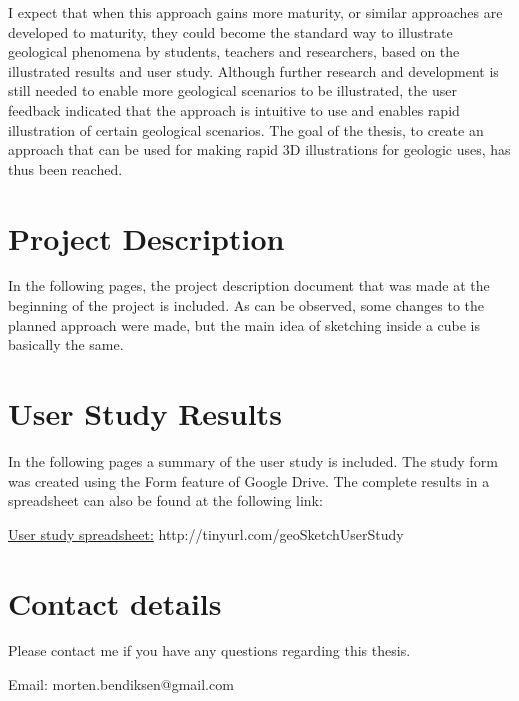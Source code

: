 \documentclass[a4paper,12pt]{report}
\begin{document}
I expect that when this approach gains more maturity, or similar approaches are developed to maturity, they could become the standard way to illustrate geological phenomena by students, teachers and researchers, based on the illustrated results and user study. Although further research and development is still needed to enable more geological scenarios to be illustrated, the user feedback indicated that the approach is intuitive to use and enables rapid illustration of certain geological scenarios. The goal of the thesis, to create an approach that can be used for making rapid 3D illustrations for geologic uses, has thus been reached.


{}




\appendix

\chapter{Project Description}
\label{apx:description}
In the following pages, the project description document that was made at the beginning of the project is included. As can be observed, some changes to the planned approach were made, but the main idea of sketching inside a cube is basically the same.



\chapter{User Study Results}
\label{apx:study}
In the following pages a summary of the user study is included. The study form was created using the Form feature of Google Drive.
The complete results in a spreadsheet can also be found at the following link:

\href{https://docs.google.com/spreadsheet/ccc?key=0AkG0DNVsDqEudEc4X3I2MWNpUVlva0toUGNldHBTRlE}{User study spreadsheet:} http://tinyurl.com/geoSketchUserStudy



\chapter{Contact details}
Please contact me if you have any questions regarding this thesis.

Email: morten.bendiksen@gmail.com
\end{document}
